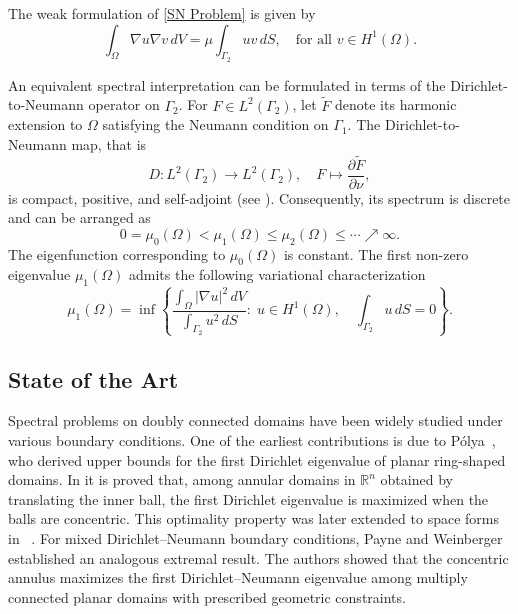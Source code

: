 \documentclass[12pt,reqno]{amsart}
\numberwithin{equation}{section}
\numberwithin{theorem}{section}
\numberwithin{equation}{section}
\numberwithin{theorem}{section}
\begin{document}
The weak formulation of \eqref{SN Problem} is given by
\begin{equation}\label{weak formulation SN}
\int_{\Omega}  \nabla u \nabla v \, dV
= \mu \int_{\Gamma_2} u v \, dS,
\quad \text{for all } v \in H^1(\Omega).
\end{equation}

An equivalent spectral interpretation can be formulated in terms of the
Dirichlet-to-Neumann operator on $\Gamma_2$. For $F \in L^2(\Gamma_2)$,
let $\widetilde{F}$ denote its harmonic extension to $\Omega$ satisfying
the Neumann condition on $\Gamma_1$. The Dirichlet-to-Neumann map, that is 
\[
D : L^2(\Gamma_2) \to L^2(\Gamma_2),
\quad F \mapsto \frac{\partial \widetilde{F}}{\partial \nu},
\]
is compact, positive, and self-adjoint
(see \cite[Chapter~III]{bandle1980isoperimetric}). Consequently, its
spectrum is discrete and can be arranged as
\[
0 = \mu_0(\Omega) < \mu_1(\Omega) \leq \mu_2(\Omega)
\leq \cdots \nearrow \infty.
\]
The eigenfunction corresponding to $\mu_0(\Omega)$ is constant. The first
non-zero eigenvalue $\mu_1(\Omega)$ admits the following variational characterization
\begin{equation}\label{characterization}
\mu_1(\Omega) =
\inf \left\{
\frac{\displaystyle \int_{\Omega} |\nabla u|^2 \, dV}
{\displaystyle \int_{\Gamma_2} u^2 \, dS}
:\;
u \in H^1(\Omega), \quad
\int_{\Gamma_2} u \, dS = 0
\right\}.
\end{equation}

\subsection{State of the Art}

Spectral problems on doubly connected domains have been widely studied under
various boundary conditions. One of the earliest contributions is due to P{\'o}lya~\cite{polya1960two}, who derived upper bounds for the first Dirichlet eigenvalue of planar ring-shaped domains. In 
\cite{kesavan2003two} it is proved that, among annular domains in $\mathbb{R}^n$
obtained by translating the inner ball, the first Dirichlet eigenvalue is maximized when the balls are concentric. This optimality property was later
extended to space forms in ~\cite{anisa2005two}. For mixed Dirichlet--Neumann boundary conditions, Payne and Weinberger
\cite{payne1961some} established an analogous extremal result. The authors showed
that the concentric annulus maximizes the first Dirichlet--Neumann eigenvalue among multiply connected planar domains with prescribed geometric
constraints. 
\end{document}
